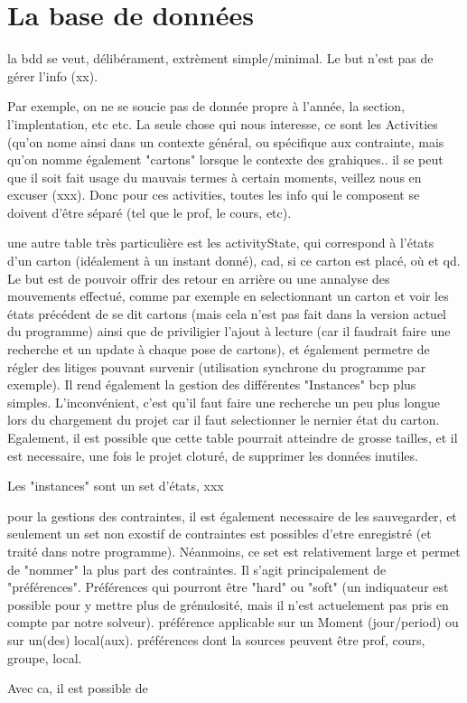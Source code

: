 \section{La base de données}
la bdd se veut, délibérament, extrèment simple/minimal.  Le but n'est pas de gérer l'info (xx).

Par exemple, on ne se soucie pas de donnée propre à l'année, la section, l'implentation, etc etc.  La seule chose qui nous interesse, ce sont les Activities (qu'on nome ainsi dans un contexte général, ou spécifique aux contrainte, mais qu'on nomme également "cartons" lorsque le contexte des grahiques.. il se peut que il soit fait usage du mauvais termes à certain moments, veillez nous en excuser (xxx).
Donc pour ces activities, toutes les info qui le composent se doivent d'être séparé (tel que le prof, le cours, etc).

une autre table très particulière est les activityState, qui correspond à l'états d'un carton (idéalement à un instant donné), cad, si ce carton est placé, où et qd.  Le but est de pouvoir offrir des retour en arrière ou une annalyse des mouvements effectué, comme par exemple en selectionnant un carton et voir les états précédent de se dit cartons (mais cela n'est pas fait dans la version actuel du programme) ainsi que de priviligier l'ajout à lecture (car il faudrait faire une recherche et un update à chaque pose de cartons), et également permetre de régler des litiges pouvant survenir (utilisation synchrone du programme par exemple).  Il rend également la gestion des différentes "Instances" bcp plus simples.  L'inconvénient, c'est qu'il faut faire une recherche un peu plus longue lors du chargement du projet car il faut selectionner le nernier état du carton. Egalement, il est possible que cette table pourrait atteindre de grosse tailles, et il est necessaire, une fois le projet cloturé, de supprimer les données inutiles. 

Les "instances" sont un set d'états, xxx

pour la gestions des contraintes, il est également necessaire de les sauvegarder, et seulement un set non exostif de contraintes est possibles d'etre enregistré (et traité dans notre programme). Néanmoins, ce set est relativement large et permet de "nommer" la plus part des contraintes.  Il s'agit principalement de "préférences".  Préférences qui pourront être "hard" ou "soft" (un indiquateur est possible pour y mettre plus de grénulosité, mais il n'est actuelement pas pris en compte par notre solveur).  préférence applicable sur un Moment (jour/period) ou sur un(des) local(aux).  préférences dont la sources peuvent être prof, cours, groupe, local.

Avec ca, il est possible de 

